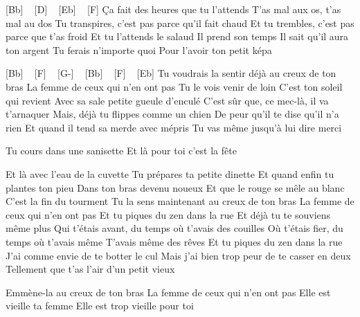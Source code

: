 
[Bb] ~ [D] ~ [Eb] ~ [F]
Ça fait des heures que tu l'attends
T'as mal aux os, t'as mal au dos
Tu transpires, c'est pas parce qu'il fait chaud
Et tu trembles, c'est pas parce que t'as froid
Et tu l'attends le salaud
Il prend son temps
Il sait qu'il aura ton argent
Tu ferais n'importe quoi
Pour l'avoir ton petit képa

[Bb] ~ [F] ~ [G-] ~ [Bb] ~ [F] ~ [Eb]
Tu voudrais la sentir déjà au creux de ton bras
La femme de ceux qui n'en ont pas
Tu le vois venir de loin
C'est ton soleil qui revient
Avec sa sale petite gueule d'enculé
C'est sûr que, ce mec-là, il va t'arnaquer
Mais, déjà tu flippes comme un chien
De peur qu'il te dise qu'il n'a rien
Et quand il tend sa merde avec mépris
Tu vas même jusqu'à lui dire merci

Tu cours dans une sanisette
Et là pour toi c'est la fête

Et là avec l'eau de la cuvette
Tu prépares ta petite dinette
Et quand enfin tu plantes ton pieu
Dans ton bras devenu noueux
Et que le rouge se mêle au blanc
C'est la fin du tourment
Tu la sens maintenant au creux de ton bras
La femme de ceux qui n'en ont pas
Et tu piques du zen dans la rue
Et déjà tu te souviens même plus
Qui t'étais avant, du temps où t'avais des couilles
Où t'étais fier, du temps où t'avais même
T'avais même des rêves
Et tu piques du zen dans la rue
J'ai comme envie de te botter le cul
Mais j'ai bien trop peur de te casser en deux
Tellement que t'as l'air d'un petit vieux

Emmène-la au creux de ton bras
La femme de ceux qui n'en ont pas
Elle est vieille ta femme
Elle est trop vieille pour toi

